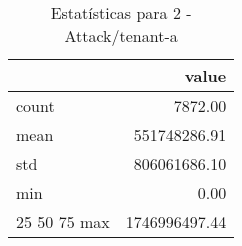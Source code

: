 \begin{table}[htbp]
\caption{Estatísticas para 2 - Attack/tenant-a}
\label{tab:2_-_attack_tenant-a_summary}
\begin{tabular}{lr}
\toprule
 & value \\
\midrule
count & 7872.00 \\
mean & 551748286.91 \\
std & 806061686.10 \\
min & 0.00 \\
25%
50%
75%
max & 1746996497.44 \\
\bottomrule
\end{tabular}
\end{table}
